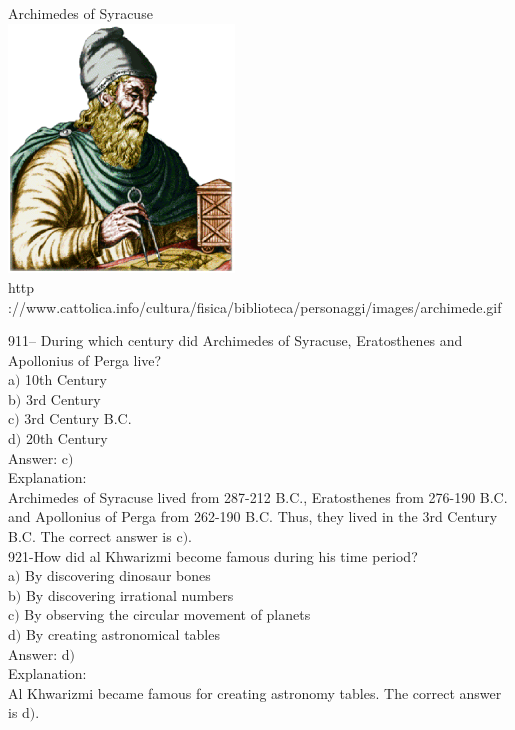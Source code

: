 \documentclass[letterpaper, 12pt]{article}
\begin{document}
        \begin{center}
        Archimedes of Syracuse\\
    \includegraphics[width=6cm]{archimede.eps}\\
        {\footnotesize http
://www.cattolica.info/cultura/fisica/biblioteca/personaggi/images/archimede.gif}
    \end{center}

911-- During which century did Archimedes of Syracuse, Eratosthenes and Apollonius of Perga live?\\

a$)$ 10th Century \\
b$)$ 3rd Century \\
c$)$ 3rd Century B.C. \\
d$)$ 20th Century   \\

Answer: c$)$\\

Explanation: \\
Archimedes of Syracuse lived from 287-212 B.C., Eratosthenes from 276-190 B.C. and Apollonius of Perga from 262-190 B.C. Thus, they lived in the 3rd Century B.C. The correct answer is c$)$.\\

921-How did al Khwarizmi become famous during his time period?\\

a$)$ By discovering dinosaur bones \\
b$)$ By discovering irrational numbers \\
c$)$ By observing the circular movement of planets \\
d$)$ By creating astronomical tables \\

Answer: d$)$\\

Explanation: \\
Al Khwarizmi became famous for creating astronomy tables.
The correct answer is d$)$.\\
\end{document}
